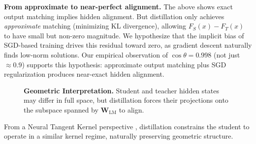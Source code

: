 \documentclass[10pt]{article} %
\theoremstyle{plain}
\theoremstyle{definition}
\theoremstyle{remark}
\begin{document}
\noindent\textbf{From approximate to near-perfect alignment.}
The above shows exact output matching implies hidden alignment. But distillation only achieves \textit{approximate} matching (minimizing KL divergence), allowing $F_S(x) - F_T(x)$ to have small but non-zero magnitude. We hypothesize that the implicit bias of SGD-based training \citep{jacot2018neural} drives this residual toward zero, as gradient descent naturally finds low-norm solutions. Our empirical observation of $\cos \theta = 0.998$ (not just $\approx 0.9$) supports this hypothesis: approximate output matching plus SGD regularization produces near-exact hidden alignment.

\begin{figure}[htbp]
    \centering
    \caption{\textbf{Geometric Interpretation.} Student and teacher hidden states may differ in full space, but distillation forces their projections onto the subspace spanned by $\mathbf{W}_{\text{LM}}$ to align.}
    \label{fig:subspace_diagram}
\end{figure}

From a Neural Tangent Kernel perspective \citep{jacot2018neural}, distillation constrains the student to operate in a similar kernel regime, naturally preserving geometric structure.
\end{document}
